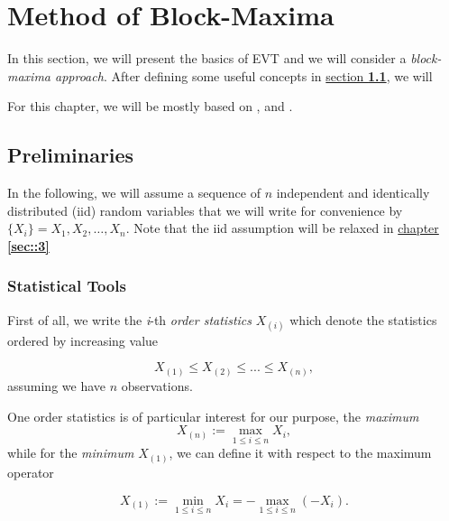 \documentclass[11pt,a4paper,openany ]{book}
\begin{document}
\setcounter{mtc}{1}
\chapter{Method of Block-Maxima} \label{sec::1}
\vspace{-1cm}
\minitoc \thispagestyle{empty}
 \vspace{1.5cm}

In this section, we will present the basics of EVT and we will consider a 
\textit{block-maxima approach}. After defining some useful concepts in 
\hyperref[sec::1.1]{section \textbf{1.1}}, we will

For this chapter, we will be mostly based on \citet[chapter 3]{coles_introduction_2001}, \citet[chapter 2]{beirlant_statistics_2006} and \citet{reiss_statistical_2007}.

\newpage
\section{Preliminaries}\label{sec::1.1}


In the following, we will assume a sequence of $n$ independent and identically distributed (iid) random variables that we will write for convenience by $\{X_i\}=X_1,X_2,\dots ,X_n$. Note that the iid assumption will be relaxed in \hyperref[sec::3]{chapter \textbf{\ref{sec::3}}}

\subsection*{Statistical Tools}
First of all, we write the \emph{i}-th \emph{order statistics} $X_{(i)} $ which denote the statistics ordered by increasing value 

\begin{equation} \label{ordereds}
X_{(1)}\leq X_{(2)}\leq ...\leq X_{(n)},
\end{equation}
assuming we have $n$ observations.

One order statistics is of particular interest for our purpose, the \emph{maximum}
\begin{equation} \label{max}
X_{(n)}:=\displaystyle{\max_{1\leq i\leq n}}X_i,
\end{equation}
while for the \emph{minimum} $X_{(1)}$, we can define it with respect to the maximum operator

\begin{equation}\label{min}
X_{(1)}:=\displaystyle{\min_{1\leq i\leq n}}X_i=- \displaystyle{\max_{1\leq i\leq n}}(-X_i).
\end{equation}
\end{document}
